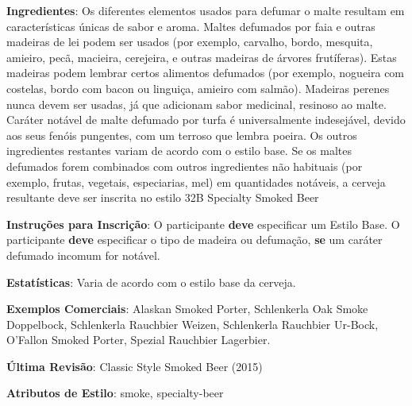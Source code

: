 \textbf{Ingredientes}: Os diferentes elementos usados para defumar o malte resultam em características únicas de sabor e aroma. Maltes defumados por faia e outras madeiras de lei podem ser usados (por exemplo, carvalho, bordo, mesquita, amieiro, pecã, macieira, cerejeira, e outras madeiras de árvores frutíferas). Estas madeiras podem lembrar certos alimentos defumados (por exemplo, nogueira com costelas, bordo com bacon ou linguiça, amieiro com salmão). Madeiras perenes nunca devem ser usadas, já que adicionam sabor medicinal, resinoso ao malte. Caráter notável de malte defumado por turfa é universalmente indesejável, devido aos seus fenóis pungentes, com um terroso que lembra poeira. Os outros ingredientes restantes variam de acordo com o estilo base. Se os maltes defumados forem combinados com outros ingredientes não habituais (por exemplo, frutas, vegetais, especiarias, mel) em quantidades notáveis, a cerveja resultante deve ser inscrita no estilo 32B Specialty Smoked Beer

\textbf{Instruções para Inscrição}: O participante \textbf{deve} especificar um Estilo Base. O participante \textbf{deve} especificar o tipo de madeira ou defumação, \textbf{se} um caráter defumado incomum for notável.

\textbf{Estatísticas}: Varia de acordo com o estilo base da cerveja.

\textbf{Exemplos Comerciais}: Alaskan Smoked Porter, Schlenkerla Oak Smoke Doppelbock, Schlenkerla Rauchbier Weizen, Schlenkerla Rauchbier Ur-Bock, O’Fallon Smoked Porter, Spezial Rauchbier Lagerbier.

\textbf{Última Revisão}: Classic Style Smoked Beer (2015)

\textbf{Atributos de Estilo}: smoke, specialty-beer
